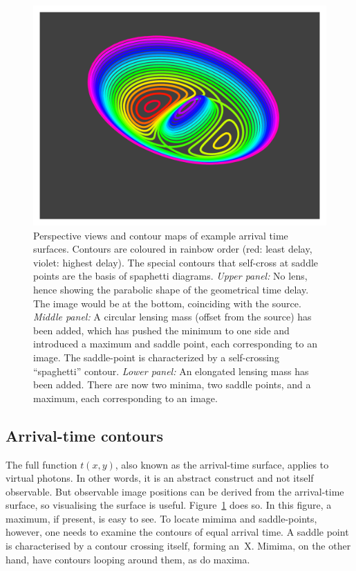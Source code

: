 \documentclass[usenatbib]{mn2e}
\newcommand{\figref}[1]{Figure~\ref{fig:#1}}
\begin{document}
\begin{figure}
\includegraphics[width=\columnwidth]{fig/arriv_2}
\caption{Perspective views and contour maps of example arrival time
  surfaces.  Contours are coloured in rainbow order (red: least delay,
  violet: highest delay).  The special contours that self-cross at
  saddle points are the basis of spaphetti diagrams.  {\em Upper
    panel:\/} No lens, hence showing the parabolic shape of the
  geometrical time delay.  The image would be at the bottom,
  coinciding with the source. {\em Middle panel:\/} A circular lensing
  mass (offset from the source) has been added, which has pushed the
  minimum to one side and introduced a maximum and saddle point, each
  corresponding to an image.  The saddle-point is characterized by a
  self-crossing ``spaghetti'' contour. {\em Lower panel:\/} An
  elongated lensing mass has been added.  There are now two minima,
  two saddle points, and a maximum, each corresponding to an image.}
\label{fig:arriv}
\end{figure}



\subsection{Arrival-time contours} \label{sec:arriv}

The full function $t(x,y)$, also known as the arrival-time surface,
applies to virtual photons.  In other words, it is an abstract
construct and not itself observable.  But observable image positions
can be derived from the arrival-time surface, so visualising the
surface is useful.  \figref{arriv} does so.  In this figure, a
maximum, if present, is easy to see.  To locate mimima and
saddle-points, however, one needs to examine the contours of equal
arrival time.  A saddle point is characterised by a contour crossing
itself, forming an~X.  Mimima, on the other hand, have contours
looping around them, as do maxima.
\end{document}
